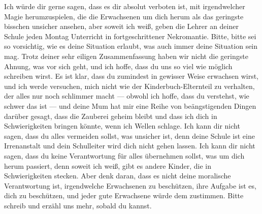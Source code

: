 \begin{writtenNote}
Ich würde dir gerne sagen, dass es dir absolut verboten ist, mit irgendwelcher Magie herumzuspielen, die die Erwachsenen um dich herum als das geringste bisschen unsicher ansehen, aber soweit ich weiß, geben die Lehrer an deiner Schule jeden Montag Unterricht in fortgeschrittener Nekromantie. Bitte, bitte sei so vorsichtig, wie es deine Situation erlaubt, was auch immer deine Situation sein mag. Trotz deiner sehr eiligen Zusammenfassung haben wir nicht die geringste Ahnung, was vor sich geht, und ich hoffe, dass du uns so viel wie möglich schreiben wirst. Es ist klar, dass du zumindest in gewisser Weise erwachsen wirst, und ich werde versuchen, mich nicht wie der Kinderbuch-Elternteil zu verhalten, der alles nur noch schlimmer macht — obwohl ich hoffe, dass du verstehst, wie schwer das ist — und deine Mum hat mir eine Reihe von beängstigenden Dingen darüber gesagt, dass die Zauberei geheim bleibt und dass ich dich in Schwierigkeiten bringen könnte, wenn ich Wellen schlage.
Ich kann dir nicht sagen, dass du alles vermeiden sollst, was unsicher ist, denn deine Schule ist eine Irrenanstalt und dein Schulleiter wird dich nicht gehen lassen. Ich kann dir nicht sagen, dass du keine Verantwortung für alles übernehmen sollst, was um dich herum passiert, denn soweit ich weiß, gibt es andere Kinder, die in Schwierigkeiten stecken. Aber denk daran, dass es nicht deine moralische Verantwortung ist, irgendwelche Erwachsenen zu beschützen, ihre Aufgabe ist es, dich zu beschützen, und jeder gute Erwachsene würde dem zustimmen. Bitte schreib und erzähl uns mehr, sobald du kannst.


\end{writtenNote}
